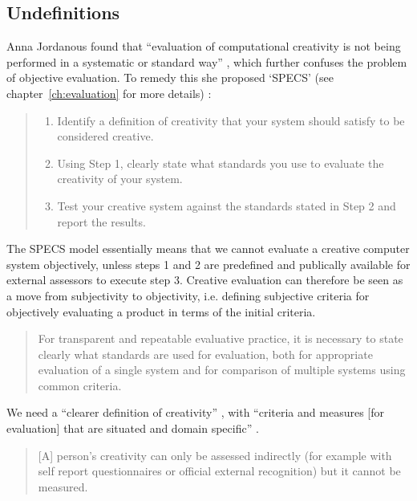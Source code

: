 

\subsection{Undefinitions}

Anna Jordanous found that ``evaluation of computational creativity is not being performed in a systematic or standard way'' \citeyear{Jordanous2011}, which further confuses the problem of objective evaluation. To remedy this she proposed `\ac{SPECS}' (see chapter~\ref{ch:evaluation} for more details) \citeyear{Jordanous2012a}:

\begin{quote}
  \begin{enumerate}
    \item Identify a definition of creativity that your system should satisfy to be considered creative.
    \item Using Step \num{1}, clearly state what standards you use to evaluate the creativity of your system.
    \item Test your creative system against the standards stated in Step \num{2} and report the results.
  \end{enumerate}
\end{quote}

The \ac{SPECS} model essentially means that we cannot evaluate a creative computer system objectively, unless steps \num{1} and \num{2} are predefined and publically available for external assessors to execute step \num{3}. Creative evaluation can therefore be seen as a move from subjectivity to objectivity, i.e. defining subjective criteria for objectively evaluating a product in terms of the initial criteria.

\begin{quotation}
  For transparent and repeatable evaluative practice, it is necessary to state clearly what standards are used for evaluation, both for appropriate evaluation of a single system and for comparison of multiple systems using common criteria. 
\end{quotation}

We need a ``clearer definition of creativity'' \autocite[p.459]{Mayer1999}, with ``criteria and measures [for evaluation] that are situated and domain specific'' \autocite[p.7]{Candy2012}.

\begin{quotation}
  [A] person's creativity can only be assessed indirectly (for example with self report questionnaires or official external recognition) but it cannot be measured. 
\end{quotation}

